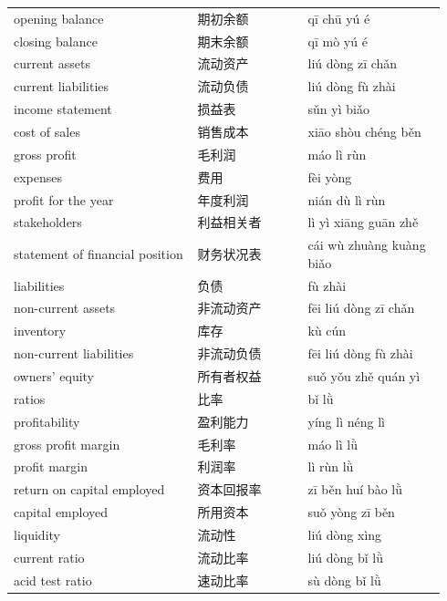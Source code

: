 \documentclass[11pt]{article}
\begin{document}
\begin{longtable}{@{}p{0.40\linewidth}p{0.24\linewidth}p{0.30\linewidth}@{}}
opening balance & 期初余额 & qī chū yú é \\
closing balance & 期末余额 & qī mò yú é \\
current assets & 流动资产 & liú dòng zī chǎn \\
current liabilities & 流动负债 & liú dòng fù zhài \\
income statement & 损益表 & sǔn yì biǎo \\
cost of sales & 销售成本 & xiāo shòu chéng běn \\
gross profit & 毛利润 & máo lì rùn \\
expenses & 费用 & fèi yòng \\
profit for the year & 年度利润 & nián dù lì rùn \\
stakeholders & 利益相关者 & lì yì xiāng guān zhě \\
statement of financial position & 财务状况表 & cái wù zhuàng kuàng biǎo \\
liabilities & 负债 & fù zhài \\
non-current assets & 非流动资产 & fēi liú dòng zī chǎn \\
inventory & 库存 & kù cún \\
non-current liabilities & 非流动负债 & fēi liú dòng fù zhài \\
owners' equity & 所有者权益 & suǒ yǒu zhě quán yì \\
ratios & 比率 & bǐ lǜ \\
profitability & 盈利能力 & yíng lì néng lì \\
gross profit margin & 毛利率 & máo lì lǜ \\
profit margin & 利润率 & lì rùn lǜ \\
return on capital employed & 资本回报率 & zī běn huí bào lǜ \\
capital employed & 所用资本 & suǒ yòng zī běn \\
liquidity & 流动性 & liú dòng xìng \\
current ratio & 流动比率 & liú dòng bǐ lǜ \\
acid test ratio & 速动比率 & sù dòng bǐ lǜ \\
\end{longtable}
\end{document}
